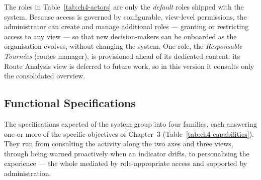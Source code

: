 The roles in Table~\ref{tab:ch4-actors} are only the \emph{default} roles shipped with the system.
Because access is governed by configurable, view-level permissions, the administrator can create and
manage additional roles --- granting or restricting access to any view --- so that new
decision-makers can be onboarded as the organisation evolves, without changing the system. One role,
the \emph{Responsable Tournées} (routes manager), is provisioned ahead of its dedicated content: its
Route Analysis view is deferred to future work, so in this version it consults only the consolidated
overview.

\subsection{Functional Specifications}

The specifications expected of the system group into four families, each answering one or more of the
specific objectives of Chapter~3 (Table~\ref{tab:ch4-capabilities}). They run from consulting the
activity along the two axes and three views, through being warned proactively when an indicator
drifts, to personalising the experience --- the whole mediated by role-appropriate access and
supported by administration.

